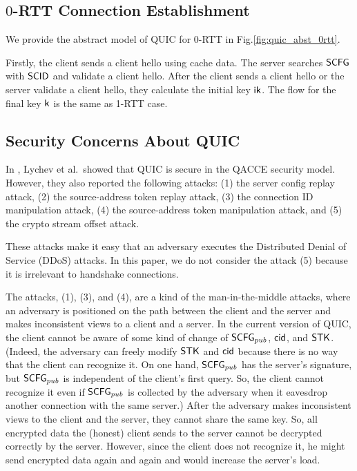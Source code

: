 \subsection{$0$-RTT Connection Establishment} \label{sec:quic_0rtt}

We provide the abstract model of QUIC for 0-RTT in
Fig.\ref{fig:quic_abst_0rtt}.

%

%
Firstly, the client sends a client hello using cache data.
The server searches $\mathsf{SCFG}$ with $\mathsf{SCID}$ and validate a
client hello.
After the client sends a client hello or the server validate
a client hello, they calculate the initial key $\mathsf{ik}$.
The flow for the final key $\mathsf{k}$ is the same as
1-RTT case.


\subsection{Security Concerns About QUIC} \label{sec:quic_detail}
In \cite{LJBN15:QUIC}, Lychev et al.~showed that QUIC is secure in the QACCE security model.
However, they also reported the following attacks:
(1) the server config replay attack, 
(2) the source-address token replay attack,
(3) the connection ID manipulation attack,
(4) the source-address token manipulation attack, and 
(5) the crypto stream offset attack. 


These attacks make it easy that an adversary executes the Distributed Denial of Service
(DDoS) attacks. 
In this paper, we do not consider the attack (5) because it is irrelevant to handshake connections.

The attacks, (1), (3), and (4), are a kind of the man-in-the-middle attacks, where  
an adversary is positioned on the path between the client and the server and 
makes inconsistent views to a client and a server. 
In the current version of QUIC, the client cannot be aware of some kind of change of 
$\mathsf{SCFG}_{pub}$, $\mathsf{cid}$, and $\mathsf{STK}$. 
(Indeed, the adversary can freely modify
$\mathsf{STK}$ and $\mathsf{cid}$ because there is no way that  the client can recognize it.
On one hand, $\mathsf{SCFG}_{pub}$ has the server's signature, but 
$\mathsf{SCFG}_{pub}$ is independent of the client's first query. So, the client cannot recognize it even if 
$\mathsf{SCFG}_{pub}$ is collected by the adversary when it eavesdrop another connection with the same server.)
After the adversary makes inconsistent views to the client and the server, 
they cannot share the same key. 
So, all encrypted data the (honest) client sends to the server cannot be decrypted correctly by the server.  
However, since the client does not recognize it, he might send encrypted data again and again and 
would increase the server's load. 
  
